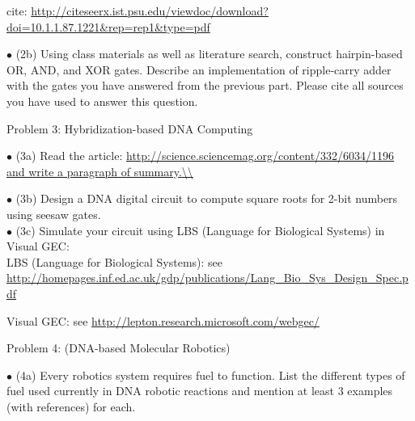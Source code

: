 \documentclass{article}
\begin{document}
cite: \url{http://citeseerx.ist.psu.edu/viewdoc/download?doi=10.1.1.87.1221&rep=rep1&type=pdf}
	  
	
$\bullet$ (2b) Using class materials as well as literature search, construct hairpin-based OR, AND, and XOR gates. Describe an implementation of ripple-carry adder with the gates you have answered from the previous part. Please cite all sources you have used to answer this question.







\newpage
\centerline{\sc Problem 3:  Hybridization-based DNA Computing}
\vspace{0.2in}
$\bullet$ (3a) Read the article: \url{ http://science.sciencemag.org/content/332/6034/1196 and write a paragraph of summary.\\ }


$\bullet$ (3b) Design a DNA digital circuit to compute square roots for 2-bit numbers using seesaw gates. \\


$\bullet$ (3c) Simulate your circuit using LBS (Language for Biological Systems) in Visual GEC: \\

LBS (Language for Biological Systems): see  
	\url{ http://homepages.inf.ed.ac.uk/gdp/publications/Lang_Bio_Sys_Design_Spec.pdf }
	
	Visual GEC: see \url{ http://lepton.research.microsoft.com/webgec/ }





\newpage
\centerline{\sc Problem 4:   (DNA-based Molecular Robotics)}
\vspace{0.2in}
$\bullet$ (4a) Every robotics system requires fuel to function. List the different types of fuel used currently in DNA robotic reactions and mention at least 3 examples (with references) for each. \\
\end{document}
